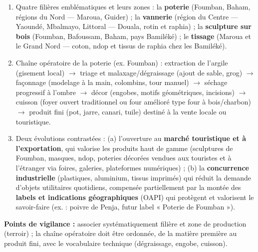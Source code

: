 \documentclass[11pt]{article}
\begin{document}
\begin{corrige}
\begin{enumerate}
\item Quatre filières emblématiques et leurs zones : la \textbf{poterie} (Foumban, Baham, régions du Nord — Maroua, Guider) ; la \textbf{vannerie} (région du Centre — Yaoundé, Mbalmayo, Littoral — Douala, rotin et raphia) ; la \textbf{sculpture sur bois} (Foumban, Bafoussam, Baham, pays Bamiléké) ; le \textbf{tissage} (Maroua et le Grand Nord — coton, ndop et tissus de raphia chez les Bamiléké).
\item Chaîne opératoire de la poterie (ex. Foumban) : extraction de l'argile (gisement local) $\rightarrow$ triage et malaxage/dégraissage (ajout de sable, grog) $\rightarrow$ façonnage (modelage à la main, colombins, tour manuel) $\rightarrow$ séchage progressif à l'ombre $\rightarrow$ décor (engobes, motifs géométriques, incisions) $\rightarrow$ cuisson (foyer ouvert traditionnel ou four amélioré type four à bois/charbon) $\rightarrow$ produit fini (pot, jarre, canari, tuile) destiné à la vente locale ou touristique.
\item Deux évolutions contrastées : (a) l'ouverture au \textbf{marché touristique et à l'exportation}, qui valorise les produits haut de gamme (sculptures de Foumban, masques, ndop, poteries décorées vendues aux touristes et à l'étranger via foires, galeries, plateformes numériques) ; (b) la \textbf{concurrence industrielle} (plastiques, aluminium, tissus imprimés) qui réduit la demande d'objets utilitaires quotidiens, compensée partiellement par la montée des \textbf{labels et indications géographiques} (OAPI) qui protègent et valorisent le savoir-faire (ex. : poivre de Penja, futur label « Poterie de Foumban »).
\end{enumerate}
\textbf{Points de vigilance :} associer systématiquement filière et zone de production (terroir) ; la chaîne opératoire doit être ordonnée, de la matière première au produit fini, avec le vocabulaire technique (dégraissage, engobe, cuisson).
\end{corrige}
\end{document}
